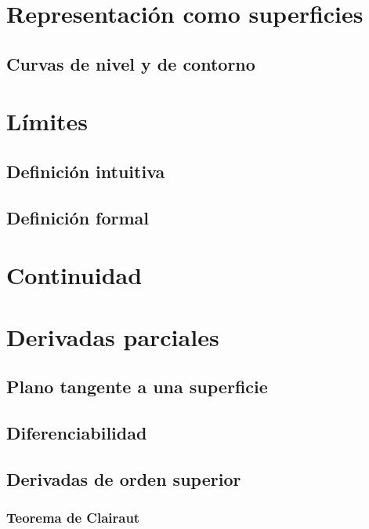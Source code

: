 \documentclass[12pt, fleqn]{report}                             %
\begin{document}
        \section{Representación como superficies}
        
            \subsection{Curvas de nivel y de contorno}
            
        \section{Límites}
            
            \subsection{Definición intuitiva}
            
            \subsection{Definición formal}
            
        \section{Continuidad}
        
        \section{Derivadas parciales}
        
            \subsection{Plano tangente a una superficie}
            
            \subsection{Diferenciabilidad}
            
            \subsection{Derivadas de orden superior}
            
                \subsubsection{Teorema de Clairaut}
                
\end{document}
